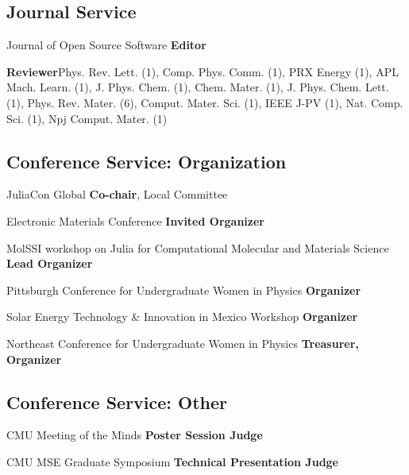 \subsection{Journal Service}
\vspace{-1mm}

{Journal of Open Source Software}
{\textbf{Editor}}
{}

{}
                     {\textbf{Reviewer}}{Phys. Rev. Lett. (1), Comp. Phys. Comm. (1), PRX Energy (1), APL Mach. Learn. (1), J. Phys. Chem. (1), Chem. Mater. (1), J. Phys. Chem. Lett. (1), Phys. Rev.  Mater. (6), Comput. Mater. Sci. (1), IEEE J-PV (1), Nat. Comp. Sci. (1), Npj Comput. Mater. (1)}

\vspace{-2.5mm}
\subsection{Conference Service: Organization}
\vspace{-1mm}
                      {JuliaCon Global}
                      {\textbf{Co-chair}, Local Committee}
                        {}

{Electronic Materials Conference}
{\textbf{Invited Organizer}}
{}

{MolSSI workshop on Julia for Computational Molecular and Materials Science}
{\textbf{Lead Organizer}}
{}

{Pittsburgh Conference for Undergraduate Women in Physics}
{\textbf{Organizer}}
{}

{Solar Energy Technology \& Innovation in Mexico Workshop}
{\textbf{Organizer}}
{}

{Northeast Conference for Undergraduate Women in Physics}
{\textbf{Treasurer, Organizer}}
{}

\vspace{-2.5mm}
\subsection{Conference Service: Other}
\vspace{-1mm}
{CMU Meeting of the Minds}
{\textbf{Poster Session Judge}}
{}


{CMU MSE Graduate Symposium}
{\textbf{Technical Presentation Judge}}
{}

